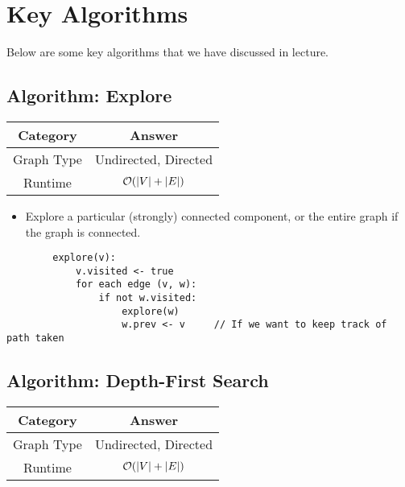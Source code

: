 \documentclass[letterpaper]{article}
\begin{document}
\newpage 
\section{Key Algorithms}
Below are some key algorithms that we have discussed in lecture.

\subsection{Algorithm: Explore}
\begin{center}
    \begin{tabular}{|c|c|}
        \hline 
        \textbf{Category} & \textbf{Answer} \\ 
        \hline 
        Graph Type & Undirected, Directed \\ 
        Runtime & $\mathcal{O}(|V| + |E|)$ \\ 
        \hline 
    \end{tabular}
\end{center}

\begin{itemize}
    \item Explore a particular (strongly) connected component, or the entire graph if the graph is connected. 
\end{itemize}

\begin{mdframed}[]
    \begin{verbatim}
        explore(v):
            v.visited <- true 
            for each edge (v, w):
                if not w.visited:
                    explore(w)
                    w.prev <- v     // If we want to keep track of path taken\end{verbatim}
\end{mdframed}


\subsection{Algorithm: Depth-First Search}
\begin{center}
    \begin{tabular}{|c|c|}
        \hline 
        \textbf{Category} & \textbf{Answer} \\ 
        \hline 
        Graph Type & Undirected, Directed \\ 
        Runtime & $\mathcal{O}(|V| + |E|)$ \\ 
        \hline 
    \end{tabular}
\end{center}
\end{document}
